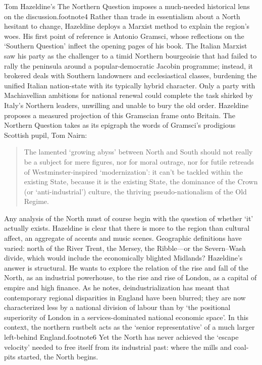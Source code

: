 \documentclass[
]{book}
\begin{document}
Tom Hazeldine's The Northern Question imposes a much-needed historical lens on the discussion.footnote4 Rather than trade in essentialism about a North hesitant to change, Hazeldine deploys a Marxist method to explain the region's woes. His first point of reference is Antonio Gramsci, whose reflections on the `Southern Question' inflect the opening pages of his book. The Italian Marxist saw his party as the challenger to a timid Northern bourgeoisie that had failed to rally the peninsula around a popular-democratic Jacobin programme; instead, it brokered deals with Southern landowners and ecclesiastical classes, burdening the unified Italian nation-state with its typically hybrid character. Only a party with Machiavellian ambitions for national renewal could complete the task shirked by Italy's Northern leaders, unwilling and unable to bury the old order. Hazeldine proposes a measured projection of this Gramscian frame onto Britain. The Northern Question takes as its epigraph the words of Gramsci's prodigious Scottish pupil, Tom Nairn:

\begin{quote}
The lamented `growing abyss' between North and South should not really be a subject for mere figures, nor for moral outrage, nor for futile retreads of Westminster-inspired `modernization': it can't be tackled within the existing State, because it is the existing State, the dominance of the Crown (or `anti-industrial') culture, the thriving pseudo-nationalism of the Old Regime.
\end{quote}

Any analysis of the North must of course begin with the question of whether `it' actually exists. Hazeldine is clear that there is more to the region than cultural affect, an aggregate of accents and music scenes. Geographic definitions have varied: north of the River Trent, the Mersey, the Ribble---or the Severn--Wash divide, which would include the economically blighted Midlands? Hazeldine's answer is structural. He wants to explore the relation of the rise and fall of the North, as an industrial powerhouse, to the rise and rise of London, as a capital of empire and high finance. As he notes, deindustrialization has meant that contemporary regional disparities in England have been blurred; they are now characterized less by a national division of labour than by `the positional superiority of London in a services-dominated national economic space'. In this context, the northern rustbelt acts as the `senior representative' of a much larger left-behind England.footnote6 Yet the North has never achieved the `escape velocity' needed to free itself from its industrial past: where the mills and coal-pits started, the North begins.
\end{document}
